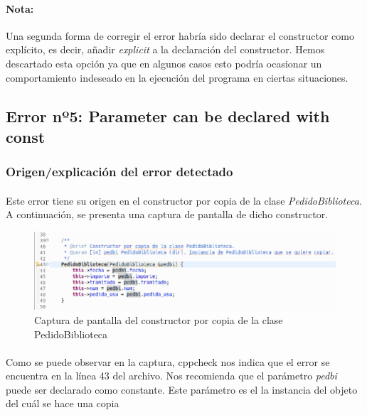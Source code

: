 			\paragraph{Nota:} Una segunda forma de corregir el error habría sido declarar el constructor como explícito, es decir, añadir \textit{explicit} a la declaración del constructor. Hemos descartado esta opción ya que en algunos casos esto podría ocasionar un comportamiento indeseado en la ejecución del programa en ciertas situaciones.

	\subsection{Error nº5: Parameter can be declared with const}
	
		\subsubsection{Origen/explicación del error detectado}
		
		\paragraph{}Este error tiene su origen en el constructor por copia de la clase \textit{PedidoBiblioteca}. A continuación, se presenta una captura de pantalla de dicho constructor.
		
		\begin{figure}[H]
			\centering
			\includegraphics[scale=0.55]{img/captura54.png}
			\caption{Captura de pantalla del constructor por copia de la clase PedidoBiblioteca}
			\label{captura54}
		\end{figure}
	
		\paragraph{}Como se puede observar en la captura, cppcheck nos indica que el error se encuentra en la línea 43 del archivo. Nos recomienda que el parámetro \textit{pedbi} puede ser declarado como constante. Este parámetro es el la instancia del objeto del cuál se hace una copia
		
